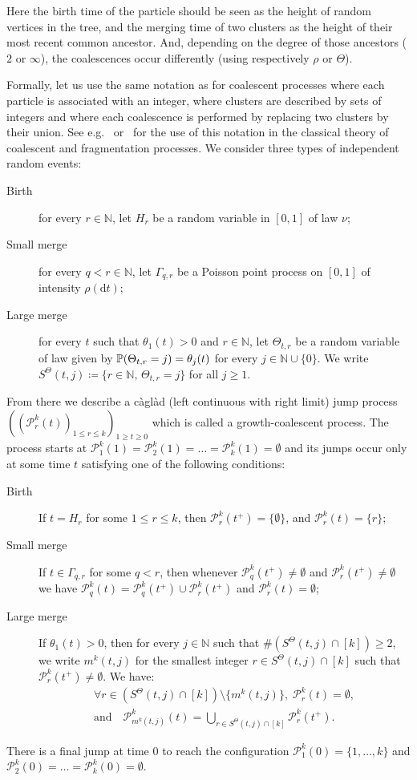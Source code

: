\documentclass[AHL,Unicode,published]{cedram}
\newcommand{\proba}[1]{\mathbb{P}\left(#1\right)}
\newcommand{\rmd}{\mathrm{d}}
\newcommand{\N}{\mathbb{N}}
\newcommand{\1}{\mathbbm{1}}
\newcommand{\Part}{\mathcal{P}}
\let\originalleft\left
\let\originalright\right
\renewcommand{\left}{\mathopen{}\mathclose\bgroup\originalleft}
\renewcommand{\right}{\aftergroup\egroup\originalright}
\let\oldforall\forall
\renewcommand*{\forall}{\mathrel{\oldforall}}
\begin{document}
Here the birth time of the particle should be seen as the height of random vertices in the tree, and the merging time of two clusters as the height of their most recent common ancestor. And, depending on the degree of those ancestors ($2$ or $\infty$), the coalescences occur differently (using respectively $\rho$ or $\Theta$).


Formally, let us use the same notation as for coalescent processes where each particle is associated with an integer, where clusters are described by sets of integers and where each coalescence is performed by replacing two clusters by their union. See e.g.\@~\cite{Pit06} or~\cite{Ber06} for the use of this notation in the classical theory of coalescent and fragmentation processes. We consider three types of independent random events:
\begin{description}
\item[Birth] for every $r\in \N$, let $H_r$ be a random variable in $[0,1]$ of law $\nu$;
\item[{Small merge}] for every $q<r\in \N$, let $\Gamma_{q,r}$ be a Poisson point process on $[0,1]$ of intensity $\rho(\rmd t)$;
\item[{Large merge}] for every $t$ such that $\theta_1(t)>0$ and $r\in \N$, let $\Theta_{t,r}$ be a random variable of law given by $\proba{\Theta_{t,r}=j}=\theta_j(t)$ for every $j\in \N\cup \{0\}$. We write $S^\Theta(t,j)\coloneqq \{r\in \N,\, \Theta_{t,r}=j \}$ for all $j \ge 1$.
\end{description}
From there we describe a {{càglàd}} (left continuous with right limit) jump process $((\Part_r^k(t))_{1\leq r \leq k})_{1\geq t \geq 0}$ which is called a growth-coalescent process. The process starts at $\Part_1^k(1)=\Part_2^k(1)=\dots =\Part_k^k(1)=\emptyset $ and its jumps occur only at some time $t$ satisfying one of the following conditions:
\begin{description}
\item[{Birth}] If $t=H_r$ for some $1\leq r \leq k$, then $\Part_r^k(t^+)=\{\emptyset\}$, and $\Part_r^k(t)=\{r\}$;
\item[{Small merge}] If $t\in \Gamma_{q,r}$ for some $q<r$, then whenever $\Part_q^k(t^+)\neq \emptyset$ and $\Part_r^k(t^+)\neq \emptyset$ we have $\Part_q^k(t)=\Part_q^k(t^+)\cup \Part_r^k(t^+)$ and $\Part_r^k(t)=\emptyset$;
\item[{Large merge}] If $\theta_1(t)>0$, then for every $j\in \N$ such that $\# (S^\Theta (t,j) \cap [k])\ge 2$, we write $m^k(t,j)$ for the smallest integer $r\in S^\Theta(t,j)\cap[k]$ such that $\Part_r^k(t^+)\neq \emptyset$. We have:
\begin{multline*}
\forall r\in (S^\Theta(t,j)\cap[k]) \setminus \{m^k(t,j) \},
\; \Part_r^k(t)=\emptyset,\\
\text{and} \quad \Part_{m^k(t,j)}^k(t)=\bigcup_{r\in S^\Theta(t,j)\cap[k]} \Part_{r}^k(t^+).
\end{multline*}
\end{description}
There is a final jump at time $0$ to reach the configuration $\Part_1^k(0)=\{1,\dots, k\}$ and $\Part_2^k(0)=\dots=\Part_k^k(0)=\emptyset$.
\end{document}
